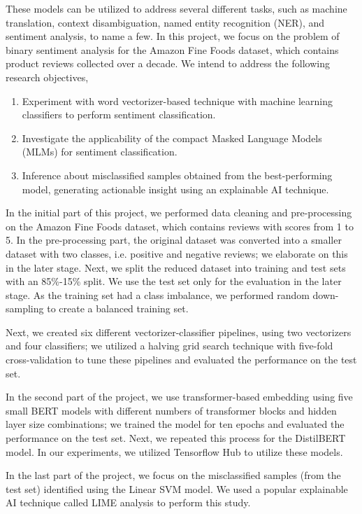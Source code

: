 \documentclass[11pt]{article}
\begin{document}
These models can be utilized to address several different tasks, such as machine translation, context disambiguation, named entity recognition (NER), and sentiment analysis, to name a few. In this project, we focus on the problem of binary sentiment analysis for the Amazon Fine Foods dataset, which contains product reviews collected over a decade. We intend to address the following research objectives,
\begin{enumerate}
    \item Experiment with word vectorizer-based technique with machine learning classifiers to perform sentiment classification.
    
    \item Investigate the applicability of the compact Masked Language Models (MLMs) for sentiment classification.
    
    \item Inference about misclassified samples obtained from the best-performing model, generating actionable insight using an explainable AI technique.
\end{enumerate}
In the initial part of this project, we performed data cleaning and pre-processing on the Amazon Fine Foods dataset, which contains reviews with scores from 1 to 5. In the pre-processing part, the original dataset was converted into a smaller dataset with two classes, i.e. positive and negative reviews; we elaborate on this in the later stage. Next, we split the reduced dataset into training and test sets with an 85\%-15\% split. We use the test set only for the evaluation in the later stage. As the training set had a class imbalance, we performed random down-sampling to create a balanced training set. 

Next, we created six different vectorizer-classifier pipelines, using two vectorizers and four classifiers; we utilized a halving grid search technique with five-fold cross-validation to tune these pipelines and evaluated the performance on the test set.

In the second part of the project, we use transformer-based embedding using five small BERT models with different numbers of transformer blocks and hidden layer size combinations; we trained the model for ten epochs and evaluated the performance on the test set. Next, we repeated this process for the DistilBERT model. In our experiments, we utilized Tensorflow Hub to utilize these models.

 In the last part of the project, we focus on the misclassified samples (from the test set) identified using the Linear SVM model. We used a popular explainable AI technique called LIME analysis \cite{LIME} to perform this study.
\end{document}
